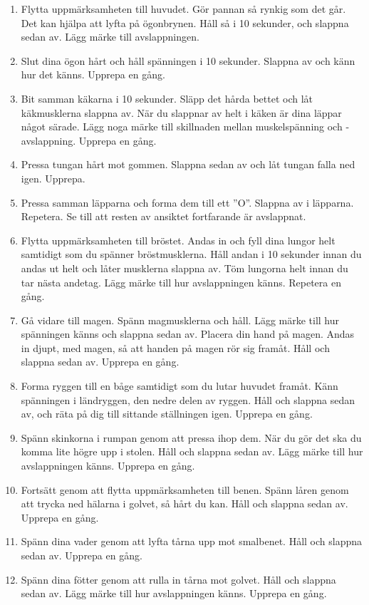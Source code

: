 \documentclass[swedish,a4paper]{book}
\begin{document}
\begin{enumerate}
\item 
Flytta uppmärksamheten till huvudet. Gör pannan så rynkig som det går. Det kan hjälpa att lyfta på ögonbrynen. Håll så i 10 sekunder, och slappna sedan av. Lägg märke till avslappningen.

\item 
Slut dina ögon hårt och håll spänningen i 10 sekunder. Slappna av och känn hur det känns. Upprepa en gång. 

\item 
Bit samman käkarna i 10 sekunder. Släpp det hårda bettet och låt käkmusklerna slappna av. När du slappnar av helt i käken är dina läppar något särade. Lägg noga märke till skillnaden mellan muskelspänning och -avslappning. Upprepa en gång.

\item 
Pressa tungan hårt mot gommen. Slappna sedan av och låt tungan falla ned igen. Upprepa.

\item 
Pressa samman läpparna och forma dem till ett ''O''. Slappna av i läpparna. Repetera. Se till att resten av ansiktet fortfarande är avslappnat.

\item 
Flytta uppmärksamheten till bröstet. Andas in och fyll dina lungor helt samtidigt som du spänner bröstmusklerna. Håll andan i 10 sekunder innan du andas ut helt och låter musklerna slappna av. Töm lungorna helt innan du tar nästa andetag. Lägg märke till hur avslappningen känns. Repetera en gång.

\item 
Gå vidare till magen. Spänn magmusklerna och håll. Lägg märke till hur spänningen känns och slappna sedan av. Placera din hand på magen. Andas in djupt, med magen, så att handen på magen rör sig framåt. Håll och slappna sedan av. Upprepa en gång. 

\item 
Forma ryggen till en båge samtidigt som du lutar huvudet framåt. Känn spänningen i ländryggen, den nedre delen av ryggen. Håll och slappna sedan av, och räta på dig till sittande ställningen igen. Upprepa en gång. 

\item 
Spänn skinkorna i rumpan genom att pressa ihop dem. När du gör det ska du komma lite högre upp i stolen. Håll och slappna sedan av. Lägg märke till hur avslappningen känns. Upprepa en gång.

\item 
Fortsätt genom att flytta uppmärksamheten till benen. Spänn låren genom att trycka ned hälarna i golvet, så hårt du kan. Håll och slappna sedan av. Upprepa en gång. 

\item 
Spänn dina vader genom att lyfta tårna upp mot smalbenet. Håll och slappna sedan av. Upprepa en gång. 

\item 
Spänn dina fötter genom att rulla in tårna mot golvet. Håll och slappna sedan av. Lägg märke till hur avslappningen känns. Upprepa en gång.

\end{enumerate}
\end{document}
